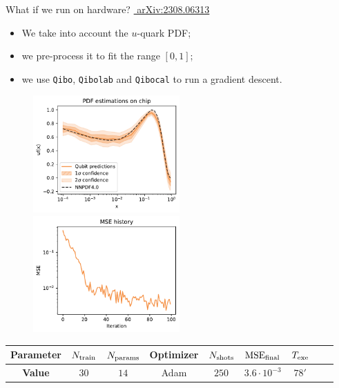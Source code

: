 \documentclass[8pt, xcolor={svgnames}, hyperref={linkcolor=black}]{beamer}
\begin{document}
\begin{frame}{What if we run on hardware? \hfill \href{https://arxiv.org/abs/2308.06313}{\faBook\,\,arXiv:2308.06313}}
\pause
\begin{itemize}[noitemsep]
\item[\faCrosshairs] We take into account the $u$-quark PDF;
\pause
\item[\faExpand] we pre-process it to fit the range $[0,1]$;
\pause
\item[\faGamepad] we use \texttt{Qibo}, \texttt{Qibolab} and \texttt{Qibocal} to run a gradient descent.
\end{itemize}
\pause
\begin{figure}  
  \includegraphics[width=0.5\textwidth]{figures/qpdf_full_stack.pdf}%
  \includegraphics[width=0.5\textwidth]{figures/loss.pdf}%
\end{figure}
\pause
\begin{table}[ht]
\centering
\begin{tabular}{ccccccccc}
\hline \hline 
\rule{0pt}{2.5ex}
\textbf{Parameter} & $N_{\rm train}$ & $N_{\rm params}$ & Optimizer & $N_{\rm shots}$ & $\text{MSE}_{\rm final}$ & $T_{\rm exe}$ \\
\hline
\rule{0pt}{2.5ex}
\textbf{Value} & $30$ & $14$ & Adam & $250$ & $3.6\cdot 10^{-3}$ & $78'$ \\
\hline \hline 
\end{tabular}
\label{tab:qml}
\end{table}
\end{frame}
\end{document}
